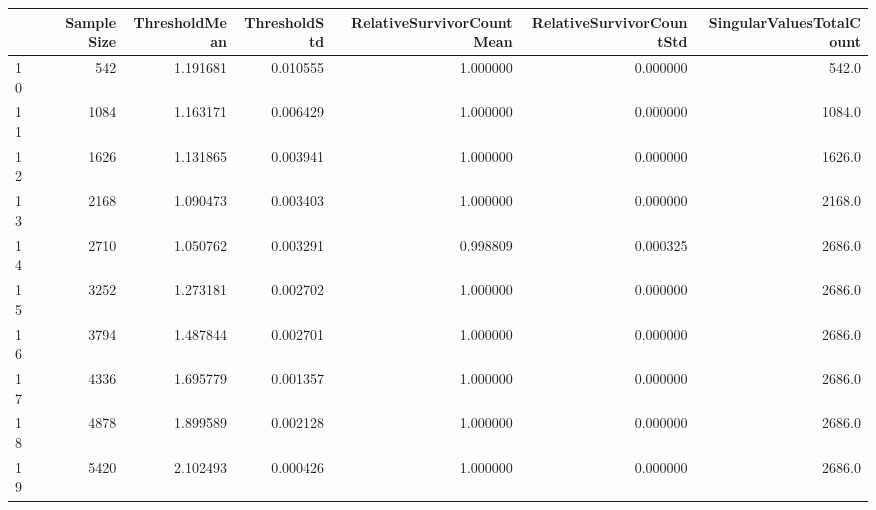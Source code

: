 \begin{tabular}{lrrrrrr}
\toprule
{} &  Sample Size &  ThresholdMean &  ThresholdStd &  RelativeSurvivorCountMean &  RelativeSurvivorCountStd &  SingularValuesTotalCount \\
\midrule
10 &          542 &       1.191681 &      0.010555 &                   1.000000 &                  0.000000 &                     542.0 \\
11 &         1084 &       1.163171 &      0.006429 &                   1.000000 &                  0.000000 &                    1084.0 \\
12 &         1626 &       1.131865 &      0.003941 &                   1.000000 &                  0.000000 &                    1626.0 \\
13 &         2168 &       1.090473 &      0.003403 &                   1.000000 &                  0.000000 &                    2168.0 \\
14 &         2710 &       1.050762 &      0.003291 &                   0.998809 &                  0.000325 &                    2686.0 \\
15 &         3252 &       1.273181 &      0.002702 &                   1.000000 &                  0.000000 &                    2686.0 \\
16 &         3794 &       1.487844 &      0.002701 &                   1.000000 &                  0.000000 &                    2686.0 \\
17 &         4336 &       1.695779 &      0.001357 &                   1.000000 &                  0.000000 &                    2686.0 \\
18 &         4878 &       1.899589 &      0.002128 &                   1.000000 &                  0.000000 &                    2686.0 \\
19 &         5420 &       2.102493 &      0.000426 &                   1.000000 &                  0.000000 &                    2686.0 \\
\bottomrule
\end{tabular}
